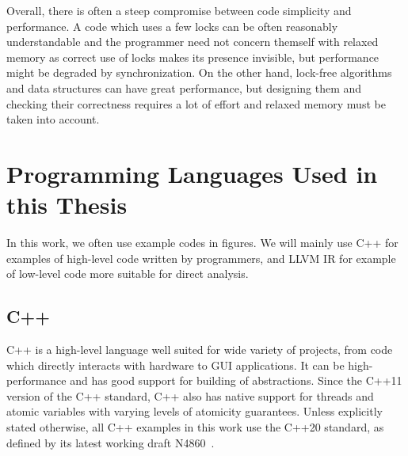 Overall, there is often a steep compromise between code simplicity and
performance.
A code which uses a few locks can be often reasonably understandable and the
programmer need not concern themself with relaxed memory as correct use of
locks makes its presence invisible, but performance might be degraded by
synchronization.
On the other hand, lock-free algorithms and data structures can have great
performance, but designing them and checking their correctness requires a lot
of effort and relaxed memory must be taken into account.

% 


\section{Programming Languages Used in this Thesis}

In this work, we often use example codes in figures.
We will mainly use C++ for examples of high-level code written by programmers,
and LLVM IR for example of low-level code more suitable for direct analysis.

\subsection{C++}

C++ is a high-level language well suited for wide variety of projects, from
code which directly interacts with hardware to GUI applications.
It can be high-performance and has good support for building of abstractions.
Since the C++11 version of the C++ standard, C++ also has native support for
threads and atomic variables with varying levels of atomicity guarantees.
Unless explicitly stated otherwise, all C++ examples in this work use the C++20
standard, as defined by its latest working draft N4860~\cite{cpp20}.

